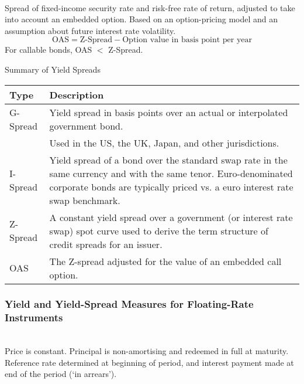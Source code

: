 \begin{definition} \\
Spread of fixed-income security rate and risk-free rate of return, adjusted to take into account an embedded option. Based on an option-pricing model and an assumption about future interest rate volatility.
\begin{equation}
\text{OAS} = \text{Z-Spread} - \text{Option value in basis point per year} \nonumber
\end{equation}
For callable bonds, OAS $<$ Z-Spread.
\end{definition}

\begin{flushleft}
Summary of Yield Spreads
\begin{tabularx}{\textwidth}{p{11em}|X}
\hline
\rowcolor{gray!30}
Type & Description \\
\hline
G-Spread & Yield spread in basis points over an actual or interpolated government bond.\\
& Used in the US, the UK, Japan, and other jurisdictions. \\
\hline
I-Spread & Yield spread of a bond over the standard swap rate in the same currency and with the same tenor. Euro-denominated corporate bonds are typically priced vs. a euro interest rate swap benchmark. \\
\hline
Z-Spread & A constant yield spread over a government (or interest rate swap) spot curve used to derive the term structure of credit spreads for an issuer. \\
\hline
OAS & The Z-spread adjusted for the value of an embedded call option. \\
\hline
\end{tabularx}
\end{flushleft}

\subsubsection{Yield and Yield-Spread Measures for Floating-Rate Instruments}

\begin{remark} \\
Price is constant. Principal is non-amortising and redeemed in full at maturity.\\
Reference rate determined at beginning of period, and interest payment made at end of the period (‘in arrears’).
\end{remark}

